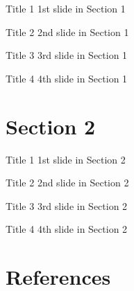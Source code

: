 \documentclass{beamer}
\begin{document}
\begin{frame}{Title 1}
    1st slide in Section 1 \cite{R-Beamer}
\end{frame}

\begin{frame}{Title 2}
    2nd slide in Section 1
\end{frame}

\begin{frame}{Title 3}
    3rd slide in Section 1
\end{frame}

\begin{frame}{Title 4}
    4th slide in Section 1
\end{frame}

\section{Section 2}

\begin{frame}{Title 1}
    1st slide in Section 2
\end{frame}

\begin{frame}{Title 2}
    2nd slide in Section 2
\end{frame}

\begin{frame}{Title 3}
    3rd slide in Section 2
\end{frame}

\begin{frame}{Title 4}
    4th slide in Section 2
\end{frame}

\section{References}

\begin{frame}[allowframebreaks]
    
    
    \nocite{*} %
\end{frame}

\end{document}
